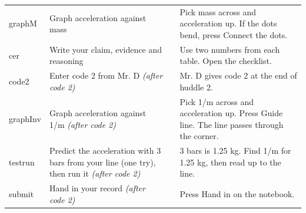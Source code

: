 \documentclass[10pt]{article}
\begin{document}
\begin{longtable}{@{}p{0.75in} p{2.2in} p{0.5in} p{3.0in}@{}}
graphM & Graph acceleration against mass &  & Pick mass across and acceleration up. If the dots bend, press Connect the dots. \\
cer & Write your claim, evidence and reasoning &  & Use two numbers from each table. Open the checklist. \\
code2 & Enter code 2 from Mr. D \textit{(after code 2)} &  & Mr. D gives code 2 at the end of huddle 2. \\
graphInv & Graph acceleration against 1/m \textit{(after code 2)} &  & Pick 1/m across and acceleration up. Press Guide line. The line passes through the corner. \\
testrun & Predict the acceleration with 3 bars from your line (one try), then run it \textit{(after code 2)} &  & 3 bars is 1.25 kg. Find 1/m for 1.25 kg, then read up to the line. \\
submit & Hand in your record \textit{(after code 2)} &  & Press Hand in on the notebook. \\
\bottomrule\end{longtable}

\clearpage
\end{document}

